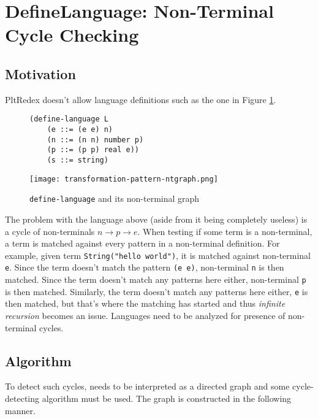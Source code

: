 \section{DefineLanguage: Non-Terminal Cycle Checking}

\subsection{Motivation}
PltRedex doesn't allow language definitions such as the one in Figure \ref{dl-ntcyclegraph}.

\begin{figure}[H]

	\centering
\begin{minipage}{0.45\linewidth}
\begin{verbatim}
(define-language L
	(e ::= (e e) n)
	(n ::= (n n) number p)
	(p ::= (p p) real e))
	(s ::= string)
\end{verbatim}
\end{minipage}
\begin{minipage}{0.45\linewidth}
	\centering
	\texttt{[image: transformation-pattern-ntgraph.png]}
\end{minipage}
	\caption{\texttt{define-language} and its non-terminal graph}
	\label{dl-ntcyclegraph}
\end{figure}

The problem with the language above (aside from it being completely useless) is a cycle of non-terminals $n \rightarrow p \rightarrow e$. When testing if some term is a non-terminal, a term is matched against every pattern in a non-terminal definition. For example, given term \texttt{String("hello world")}, it is matched against non-terminal \texttt{e}. Since  the term doesn't match the pattern \texttt{(e e)}, non-terminal \texttt{n} is then matched. Since the term doesn't match any patterns here either, non-terminal \texttt{p} is then matched. Similarly, the term doesn't match any patterns here either, \texttt{e} is then matched, but that's where the matching has started and thus \textit{infinite recursion} becomes an issue. Languages need to be analyzed for presence of non-terminal cycles.

\subsection{Algorithm}
To detect such cycles, \DefineLanguageNoArg \space needs to be interpreted as a directed graph and some cycle-detecting algorithm must be used. The graph is constructed in the following manner.

